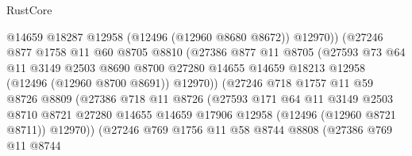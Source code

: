 \begin{lexlean}{RustCore}
\begin{coremodule}
                              @14659
                              @18287
                              @12958
                              (@12496 (@12960 @8680 @8672))
                              @12970))
                          (@27246
                            @877
                            @1758
                            @11
                            @60
                            @8705
                            @8810
                            (@27386
                              @877
                              @11
                              @8705
                              (@27593
                                @73
                                @64
                                @11
                                @3149
                                @2503
                                @8690
                                @8700
                                @27280
                                @14655
                                @14659
                                @18213
                                @12958
                                (@12496 (@12960 @8700 @8691))
                                @12970))
                            (@27246
                              @718
                              @1757
                              @11
                              @59
                              @8726
                              @8809
                              (@27386
                                @718
                                @11
                                @8726
                                (@27593
                                  @171
                                  @64
                                  @11
                                  @3149
                                  @2503
                                  @8710
                                  @8721
                                  @27280
                                  @14655
                                  @14659
                                  @17906
                                  @12958
                                  (@12496 (@12960 @8721 @8711))
                                  @12970))
                              (@27246
                                @769
                                @1756
                                @11
                                @58
                                @8744
                                @8808
                                (@27386
                                  @769
                                  @11
                                  @8744

\end{coremodule}
\end{lexlean}
